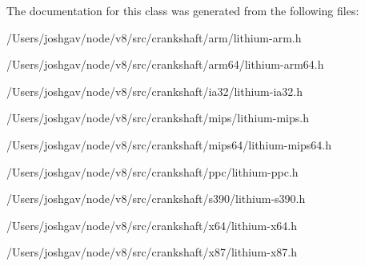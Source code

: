 The documentation for this class was generated from the following files\+:\begin{DoxyCompactItemize}
\item 
/\+Users/joshgav/node/v8/src/crankshaft/arm/lithium-\/arm.\+h\item 
/\+Users/joshgav/node/v8/src/crankshaft/arm64/lithium-\/arm64.\+h\item 
/\+Users/joshgav/node/v8/src/crankshaft/ia32/lithium-\/ia32.\+h\item 
/\+Users/joshgav/node/v8/src/crankshaft/mips/lithium-\/mips.\+h\item 
/\+Users/joshgav/node/v8/src/crankshaft/mips64/lithium-\/mips64.\+h\item 
/\+Users/joshgav/node/v8/src/crankshaft/ppc/lithium-\/ppc.\+h\item 
/\+Users/joshgav/node/v8/src/crankshaft/s390/lithium-\/s390.\+h\item 
/\+Users/joshgav/node/v8/src/crankshaft/x64/lithium-\/x64.\+h\item 
/\+Users/joshgav/node/v8/src/crankshaft/x87/lithium-\/x87.\+h\end{DoxyCompactItemize}
